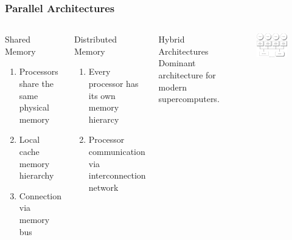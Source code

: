 \documentclass{beamer}
\begin{document}
\begin{frame}
\frametitle{Parallel Architectures}
\begin{columns}[c]

\linespread{0.5}
\begin{block}{Shared Memory}
\begin{enumerate}
\item {\fontsize{8}{6}\selectfont Processors share the same physical memory}
\item {\fontsize{8}{6}\selectfont Local cache memory hierarchy}
\item {\fontsize{8}{6}\selectfont Connection via memory bus}
\end{enumerate}
\end{block}

\begin{block}{Distributed Memory}
\begin{enumerate}
\item {\fontsize{8}{6}\selectfont Every processor has its own memory hierarcy}
\item {\fontsize{8}{6}\selectfont Processor communication via interconnection network}
\end{enumerate}
\end{block}

\begin{block}{Hybrid Architectures}
Dominant architecture for modern supercomputers.
\end{block}

\begin{figure}
\includegraphics[width=\linewidth,right]{shared_mem.jpg}
\end{figure}


\end{columns}
\end{frame}
\end{document}
